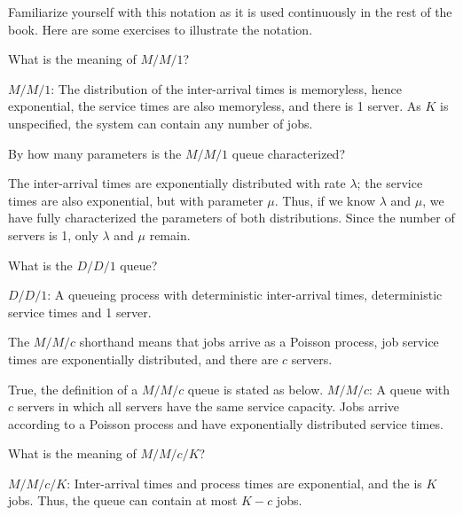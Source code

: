 Familiarize yourself with this notation as it is used continuously in the rest of the book. Here are some exercises to illustrate the notation.

\begin{extra}
 What is the meaning of $M/M/1$?
\begin{solution}
$M/M/1$: The distribution of the inter-arrival times is
 memoryless, hence exponential, the service times are also
 memoryless, and there is 1 server. As $K$ is unspecified, the system can contain any number of jobs.
\end{solution}
\end{extra}

\begin{extra}
 By how many parameters is the $M/M/1$ queue characterized?
\begin{solution}
 The inter-arrival times are exponentially distributed with rate $\lambda$; the service times are also exponential, but with parameter $\mu$. Thus, if we know $\lambda$ and $\mu$, we have fully characterized the parameters of both distributions. Since the number of servers is 1, only $\lambda$ and $\mu$ remain.
\end{solution}
\end{extra}

\begin{extra}
What is the $D/D/1$ queue? 
\begin{solution}
$D/D/1$: A queueing process with deterministic inter-arrival times, deterministic service times and 1 server.
\end{solution}
\end{extra}

\begin{extra}\mc
The $M/M/c$ shorthand means that jobs arrive as a Poisson process, job service times are exponentially distributed, and there are $c$ servers.
\begin{solution}
True, the definition of a $M/M/c$ queue is stated as below.
$M/M/c$: A  queue with $c$ servers in which
 all servers have the same service capacity. Jobs arrive according to a
 Poisson process and have exponentially distributed service times.
\end{solution}
\end{extra}

\begin{extra}
 What is the meaning of $M/M/c/K$?
\begin{solution}
$M/M/c/K$: Inter-arrival times and process times are exponential,
 and the  is $K$ jobs. Thus, the queue can
 contain at most $K-c$ jobs. 

\end{solution}
\end{extra}


